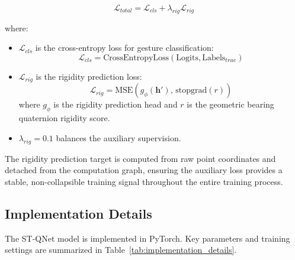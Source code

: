 \documentclass[journal]{IEEEtran}
\theoremstyle{plain}
\begin{document}
\begin{equation}
    \mathcal{L}_{total} = \mathcal{L}_{cls} + \lambda_{rig} \mathcal{L}_{rig}
    \label{eq:total_loss_new}
\end{equation}

where:
\begin{itemize}
    \item \(\mathcal{L}_{cls}\) is the cross-entropy loss for gesture classification:
    \begin{equation}
        \mathcal{L}_{cls} = \text{CrossEntropyLoss}(\text{Logits}, \text{Labels}_{true})
    \end{equation}
    \item \(\mathcal{L}_{rig}\) is the rigidity prediction loss:
    \begin{equation}
        \mathcal{L}_{rig} = \text{MSE}(g_\phi(\mathbf{h}'), \, \text{stopgrad}(r))
    \end{equation}
    where $g_\phi$ is the rigidity prediction head and $r$ is the geometric bearing quaternion rigidity score.
    \item \(\lambda_{rig} = 0.1\) balances the auxiliary supervision.
\end{itemize}

The rigidity prediction target is computed from raw point coordinates and detached from the computation graph, ensuring the auxiliary loss provides a stable, non-collapsible training signal throughout the entire training process.

\subsection{Implementation Details}
The ST-QNet model is implemented in PyTorch. Key parameters and training settings are summarized in Table~\ref{tab:implementation_details}.
\end{document}

